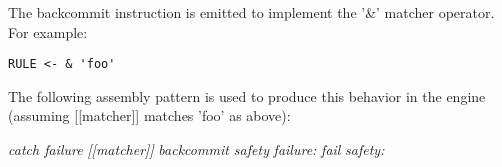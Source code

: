 The backcommit instruction is emitted to implement the
'\&' matcher operator. For example:

\begin{myquote}
\begin{verbatim}
RULE <- & 'foo'
\end{verbatim}
\end{myquote}

The following assembly pattern is used to produce this behavior
in the engine (assuming [[matcher]] matches 'foo' as above):

\begin{myquote}
\textit{catch failure} \newline
\textit{[[matcher]]} \newline
\textit{backcommit safety} \newline
\textit{failure:} \newline
\textit{fail} \newline
\textit{safety:} \newline
\end{myquote}
